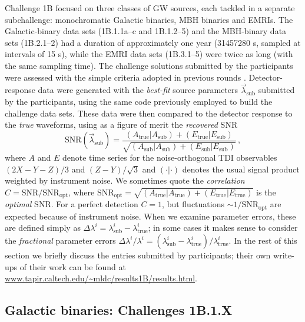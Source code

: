 \documentclass{iopart}
\begin{document}
Challenge 1B focused on three classes of GW sources, each tackled in a separate subchallenge: monochromatic Galactic binaries, MBH binaries and EMRIs. The Galactic-binary data sets (1B.1.1a--c and 1B.1.2--5) and the MBH-binary data sets (1B.2.1--2) had a duration of approximately one year (31457280 s, sampled at intervals of 15 s), while the EMRI data sets (1B.3.1--5) were twice as long (with the same sampling time). The challenge solutions submitted by the participants were assessed with the simple criteria adopted in previous rounds \cite{mldcgwdaw1, mldcamaldi2}. Detector-response data were generated with the \emph{best-fit} source parameters $\vec{\lambda}_\mathrm{sub}$ submitted by the participants, using the same code previously employed to build the challenge data sets. These data were then compared to the detector response to the \emph{true} waveforms, using as a figure of merit the \emph{recovered} SNR
%
\begin{equation}
\mathrm{SNR}(\vec{\lambda}_\mathrm{sub}) = \frac{(A_\mathrm{true}|A_\mathrm{sub}) + (E_\mathrm{true}|E_\mathrm{sub})} {\sqrt{(A_\mathrm{sub}|A_\mathrm{sub}) + (E_\mathrm{sub}|E_\mathrm{sub})}}\,,
\label{e:SNR}
\end{equation}
%
where $A$ and $E$ denote time series for the noise-orthogonal TDI observables $(2X - Y - Z)/3$ and $(Z - Y)/\sqrt{3}$ \cite{sensitivity} and $(\cdot|\cdot)$ denotes the usual signal product weighted by instrument noise.
We sometimes quote the \emph{correlation} $C = \mathrm{SNR} / \mathrm{SNR}_\mathrm{opt}$, where 
$\mathrm{SNR}_\mathrm{opt} = \sqrt{(A_\mathrm{true}|A_\mathrm{true}) + (E_\mathrm{true}|E_\mathrm{true})}$ is the \emph{optimal} SNR. For a perfect detection $C = 1$, but fluctuations $\sim 1 / \mathrm{SNR}_\mathrm{opt}$ are expected because of instrument noise. When we examine parameter errors, these are defined simply as
$\Delta\lambda^i = \lambda^i_\mathrm{sub} - \lambda^i_\mathrm{true}$; in some cases it makes sense to consider the \emph{fractional} parameter errors $\Delta \lambda^i / \lambda^i = (\lambda^i_\mathrm{sub} - \lambda^i_\mathrm{true}) / \lambda^i_\mathrm{true}$.
In the rest of this section we briefly discuss the entries submitted by participants; their own write-ups of their work can be found at \url{www.tapir.caltech.edu/~mldc/results1B/results.html}.

\subsection{Galactic binaries: Challenges 1B.1.X}
\end{document}
